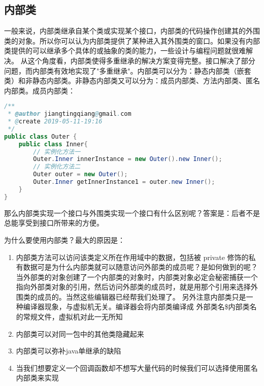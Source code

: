 \subsection{内部类}

一般来说，内部类继承自某个类或实现某个接口，内部类的代码操作创建其的外围类的对象。所以你可以认为内部类提供了某种进入其外围类的窗口。如果没有内部类提供的可以继承多个具体的或抽象的类的能力，一些设计与编程问题就很难解决。 从这个角度看，内部类使得多重继承的解决方案变得完整。接口解决了部分问题，而内部类有效地实现了"多重继承"。内部类可以分为：静态内部类（嵌套类）和非静态内部类。非静态内部类又可以分为：成员内部类、方法内部类、匿名内部类。成员内部类：

\begin{lstlisting}[language=Java]
/**
 * @author jiangtingqiang@gmail.com
 * @create 2019-05-11-19:16
 */
public class Outer {
    public class Inner{
        // 实例化方法一
        Outer.Inner innerInstance = new Outer().new Inner();
        // 实例化方法二
        Outer outer = new Outer();
        Outer.Inner getInnerInstance1 = outer.new Inner();
    }
}
\end{lstlisting}


那么内部类实现一个接口与外围类实现一个接口有什么区别呢？答案是：后者不是总能享受到接口所带来的方便。

为什么要使用内部类？最大的原因是：

\begin{enumerate}
\item {内部类方法可以访问该类定义所在作用域中的数据，包括被 private 修饰的私有数据}可是为什么内部类就可以随意访问外部类的成员呢？是如何做到的呢？当外部类的对象创建了一个内部类的对象时，内部类对象必定会秘密捕获一个指向外部类对象的引用，然后访问外部类的成员时，就是用那个引用来选择外围类的成员的。当然这些编辑器已经帮我们处理了。 另外注意内部类只是一种编译器现象，与虚拟机无关。编译器会将内部类编译成 外部类名\$内部类名 的常规文件，虚拟机对此一无所知
\item {内部类可以对同一包中的其他类隐藏起来}
\item {内部类可以弥补java单继承的缺陷}
\item {当我们想要定义一个回调函数却不想写大量代码的时候我们可以选择使用匿名内部类来实现}
\end{enumerate}
